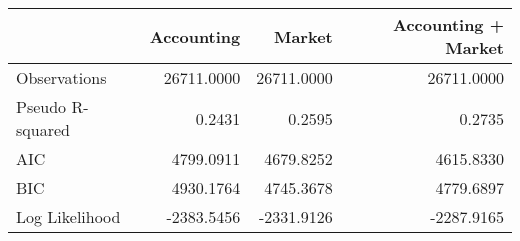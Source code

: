 \begin{tabular}{lrrr}
\toprule
 & Accounting & Market & Accounting + Market \\
\midrule
Observations & 26711.0000 & 26711.0000 & 26711.0000 \\
Pseudo R-squared & 0.2431 & 0.2595 & 0.2735 \\
AIC & 4799.0911 & 4679.8252 & 4615.8330 \\
BIC & 4930.1764 & 4745.3678 & 4779.6897 \\
Log Likelihood & -2383.5456 & -2331.9126 & -2287.9165 \\
\bottomrule
\end{tabular}
